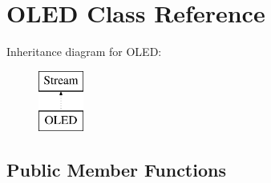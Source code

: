 \hypertarget{class_o_l_e_d}{\section{O\-L\-E\-D Class Reference}
\label{class_o_l_e_d}
}
Inheritance diagram for O\-L\-E\-D\-:\begin{figure}[H]
\begin{center}
\leavevmode
\includegraphics[height=2.000000cm]{class_o_l_e_d}
\end{center}
\end{figure}
\subsection*{Public Member Functions}
